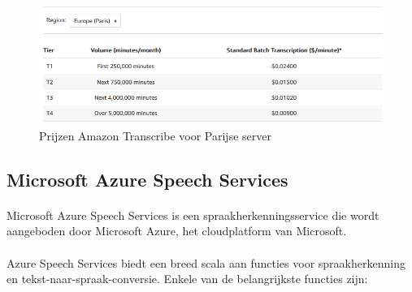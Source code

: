 \begin{figure}[h]
    \centering
    \includegraphics[width=\linewidth*3/4]{graphics/AmazonTranscribePricing.png}
    \caption{Prijzen Amazon Transcribe voor Parijse server \autocite{Amazon2023}}
    \label{fig:PricingAmazonTranscribe}
\end{figure}

\subsection{Microsoft Azure Speech Services}%

\paragraph{}
Microsoft Azure Speech Services is een spraakherkenningsservice die wordt aangeboden door Microsoft Azure, het cloudplatform van Microsoft.

\paragraph{}
Azure Speech Services biedt een breed scala aan functies voor spraakherkenning en tekst-naar-spraak-conversie. Enkele van de belangrijkste functies zijn:

